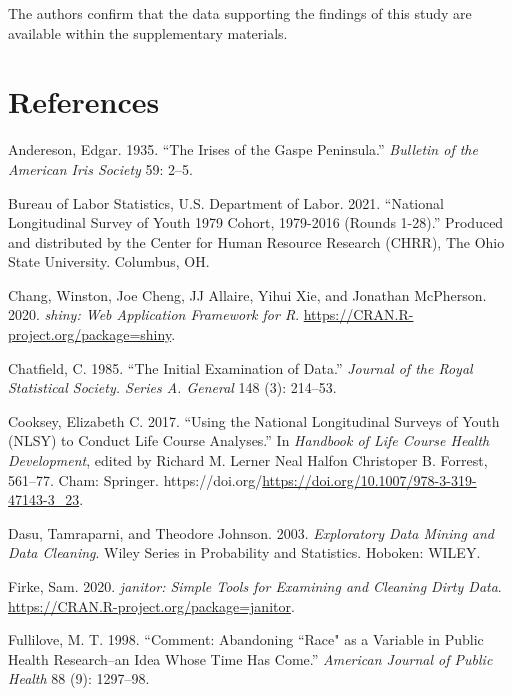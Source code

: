 \documentclass{article}
\newlength{\cslhangindent}
\newlength{\cslentryspacingunit} %
\newenvironment{CSLReferences}[2] %
 {%
  \setlength{\parindent}{0pt}
  \ifodd #1
  \let\oldpar\par
  \def\par{\hangindent=\cslhangindent\oldpar}
  \fi
  \setlength{\parskip}{#2\cslentryspacingunit}
 }%
 {}
\begin{document}
The authors confirm that the data supporting the findings of this study are available within the supplementary materials.

\hypertarget{references}{%
\section*{References}\label{references}}

\hypertarget{refs}{}
\begin{CSLReferences}{1}{0}
\leavevmode{}%
Andereson, Edgar. 1935. {``The Irises of the Gaspe Peninsula.''} \emph{Bulletin of the American Iris Society} 59: 2--5.

\leavevmode{}%
Bureau of Labor Statistics, U.S. Department of Labor. 2021. {``National Longitudinal Survey of Youth 1979 Cohort, 1979-2016 (Rounds 1-28).''} Produced and distributed by the Center for Human Resource Research (CHRR), The Ohio State University. Columbus, OH.

\leavevmode{}%
Chang, Winston, Joe Cheng, JJ Allaire, Yihui Xie, and Jonathan McPherson. 2020. \emph{{shiny: Web Application Framework for R}}. \url{https://CRAN.R-project.org/package=shiny}.

\leavevmode{}%
Chatfield, C. 1985. {``The Initial Examination of Data.''} \emph{Journal of the Royal Statistical Society. Series A. General} 148 (3): 214--53.

\leavevmode{}%
Cooksey, Elizabeth C. 2017. {``Using the National Longitudinal Surveys of Youth (NLSY) to Conduct Life Course Analyses.''} In \emph{Handbook of Life Course Health Development}, edited by Richard M. Lerner Neal Halfon Christoper B. Forrest, 561--77. Cham: Springer. https://doi.org/\url{https://doi.org/10.1007/978-3-319-47143-3_23}.

\leavevmode{}%
Dasu, Tamraparni, and Theodore Johnson. 2003. \emph{Exploratory Data Mining and Data Cleaning}. Wiley Series in Probability and Statistics. Hoboken: WILEY.

\leavevmode{}%
Firke, Sam. 2020. \emph{{janitor: Simple Tools for Examining and Cleaning Dirty Data}}. \url{https://CRAN.R-project.org/package=janitor}.

\leavevmode{}%
Fullilove, M. T. 1998. {``Comment: Abandoning ``Race" as a Variable in Public Health Research--an Idea Whose Time Has Come.''} \emph{American Journal of Public Health} 88 (9): 1297--98.


\end{CSLReferences}
\end{document}
